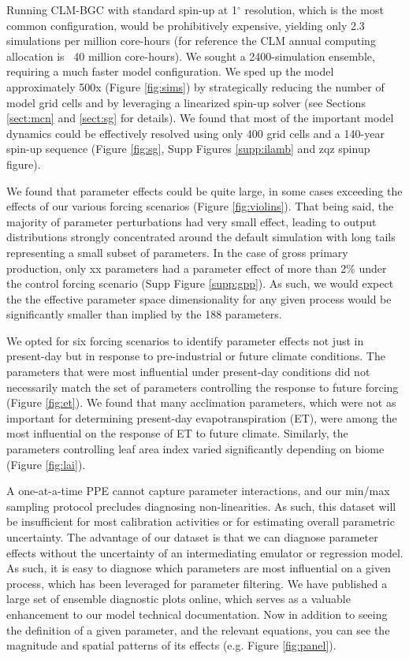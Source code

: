 \documentclass[draft]{agujournal2019}
\begin{document}
Running CLM-BGC with standard spin-up at 1$^\circ$ resolution, which is the most common configuration, would be prohibitively expensive, yielding only 2.3 simulations per million core-hours (for reference the CLM annual computing allocation is ~40 million core-hours). We sought a 2400-simulation ensemble, requiring a much faster model configuration. We sped up the model approximately 500x (Figure \ref{fig:sims}) by strategically reducing the number of model grid cells and by leveraging a linearized spin-up solver (see Sections \ref{sect:mcn} and \ref{sect:sg} for details). We found that most of the important model dynamics could be effectively resolved using only 400 grid cells and a 140-year spin-up sequence (Figure \ref{fig:sg}, Supp Figures \ref{supp:ilamb} and zqz spinup figure).

We found that parameter effects could be quite large, in some cases exceeding the effects of our various forcing scenarios (Figure \ref{fig:violins}). That being said, the majority of parameter perturbations had very small effect, leading to output distributions strongly concentrated around the default simulation with long tails representing a small subset of parameters. In the case of gross primary production, only xx parameters had a parameter effect of more than 2\% under the control forcing scenario (Supp Figure \ref{supp:gpp}). As such, we would expect the the effective parameter space dimensionality for any given process would be significantly smaller than implied by the 188 parameters.

We opted for six forcing scenarios to identify parameter effects not just in present-day but in response to pre-industrial or future climate conditions. The parameters that were most influential under present-day conditions did not necessarily match the set of parameters controlling the response to future forcing (Figure \ref{fig:et}). We found that many acclimation parameters, which were not as important for determining present-day evapotranspiration (ET), were among the most influential on the response of ET to future climate. Similarly, the parameters controlling leaf area index varied significantly depending on biome (Figure \ref{fig:lai}).

A one-at-a-time PPE cannot capture parameter interactions, and our min/max sampling protocol precludes diagnosing non-linearities. As such, this dataset will be insufficient for most calibration activities or for estimating overall parametric uncertainty. The advantage of our dataset is that we can diagnose parameter effects without the uncertainty of an intermediating emulator or regression model. As such, it is easy to diagnose which parameters are most influential on a given process, which has been leveraged for parameter filtering. We have published a large set of ensemble diagnostic plots online, which serves as a valuable enhancement to our model technical documentation. Now in addition to seeing the definition of a given parameter, and the relevant equations, you can see the magnitude and spatial patterns of its effects (e.g. Figure \ref{fig:panel}).
\end{document}
